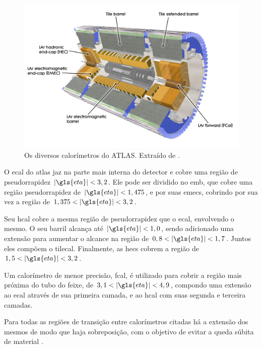 \begin{figure}[h!t]
\centering
\includegraphics[width=\textwidth]{figures/calorimetros.pdf}
\caption[Os diversos subsistemas de calorimetria do ATLAS]{
Os diversos calorímetros do ATLAS. Extraído de
\cite{atlas_calorimeter_photo}.}
\label{fig:cal_atlas}
\end{figure}

O \gls{ecal} do \gls{atlas} jaz na parte mais interna do detector e cobre uma região de 
pseudorrapidez $|\gls{eta}|<3,2$. Ele pode ser dividido no
\gls{emb}, que cobre uma região pseudorrapidez de $|\gls{eta}|<1,475$, 
e por suas \glspl{emec}, cobrindo por sua vez a região de $1,375<|\gls{eta}|<3,2$.

Seu \gls{hcal} cobre a mesma região de pseudorrapidez que o \gls{ecal}, envolvendo
o mesmo. O seu barril alcança até $|\gls{eta}|<1,0$, sendo adicionado uma
extensão para aumentar o alcance na região de $0,8<|\gls{eta}|<1,7$. Juntos eles
compõem o \gls{tilecal}. Finalmente, as \glspl{hec} cobrem a região de $1,5<|\gls{eta}|<3,2$. 

Um calorímetro de menor precisão, \gls{fcal}, 
é utilizado para cobrir a região mais próxima do tubo do feixe, de
$3,1<|\gls{eta}|<4,9$, compondo uma extensão ao \gls{ecal} através de sua primeira camada,  
e ao \gls{hcal} com suas segunda e terceira camadas. 

Para todas as regiões de transição entre calorímetros citadas 
há a extensão dos mesmos de modo que haja sobreposição, 
com o objetivo de evitar a queda súbita de material \cite{paper_atlas}. 

